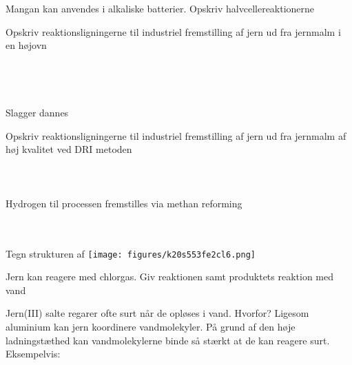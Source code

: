 \begin{flashcard}[Anvendelse]{Mangan kan anvendes i alkaliske batterier. Opskriv halvcellereaktionerne}
\\
\end{flashcard}

\begin{flashcard}[Fremstilling]{Opskriv reaktionsligningerne til industriel fremstilling af jern ud fra jernmalm i en højovn}
\\
\\
\\
\\
\\
Slagger dannes
\\
\end{flashcard}

\begin{flashcard}[Fremstilling]{Opskriv reaktionsligningerne til industriel fremstilling af jern ud fra jernmalm af høj kvalitet ved DRI metoden}
\\
\\
\\
\\
Hydrogen til processen fremstilles via methan reforming\\
\\
\\
\end{flashcard}

\begin{flashcard}[Struktur]{Tegn strukturen af }
\texttt{[image: figures/k20s553fe2cl6.png]}
\end{flashcard}

\begin{flashcard}[Reaktion]{Jern kan reagere med chlorgas. Giv reaktionen samt produktets reaktion med vand}
\\\vspace*{0.5cm}
\end{flashcard}

\begin{flashcard}[Egenskab]{Jern(III) salte regarer ofte surt når de opløses i vand. Hvorfor?}
Ligesom aluminium kan jern koordinere vandmolekyler. På grund af den høje ladningstæthed kan vandmolekylerne binde så stærkt at de kan reagere surt.\\
Eksempelvis:\\
\end{flashcard}


